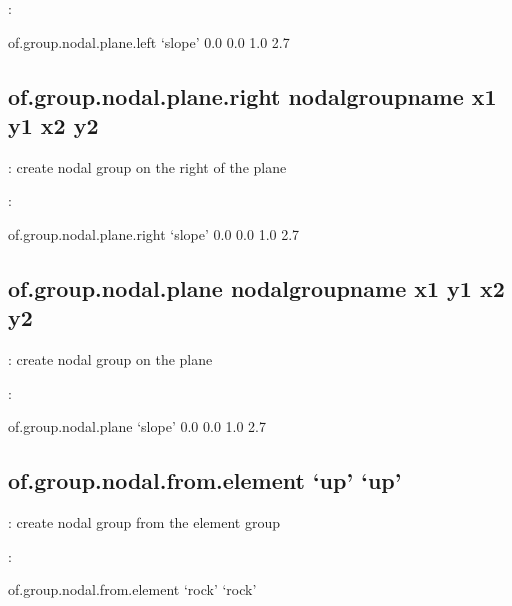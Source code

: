 \documentclass[letterpaper,10pt,english]{sphinxmanual}
\begin{document}
:

\begin{sphinxVerbatim}[commandchars=\\\{\}]
of.group.nodal.plane.left ‘slope’ 0.0 0.0 1.0 2.7
\end{sphinxVerbatim}


\subsection{of.group.nodal.plane.right nodalgroupname x1 y1 x2 y2}
\label{\detokenize{rst_tutorials/command_line_guide:of-group-nodal-plane-right-nodalgroupname-x1-y1-x2-y2}}
: create nodal group on the right of the plane

:

\begin{sphinxVerbatim}[commandchars=\\\{\}]
of.group.nodal.plane.right ‘slope’ 0.0 0.0 1.0 2.7
\end{sphinxVerbatim}


\subsection{of.group.nodal.plane nodalgroupname x1 y1 x2 y2}
\label{\detokenize{rst_tutorials/command_line_guide:of-group-nodal-plane-nodalgroupname-x1-y1-x2-y2}}
: create nodal group on the plane

:

\begin{sphinxVerbatim}[commandchars=\\\{\}]
of.group.nodal.plane ‘slope’ 0.0 0.0 1.0 2.7
\end{sphinxVerbatim}


\subsection{of.group.nodal.from.element ‘up’ ‘up’}
\label{\detokenize{rst_tutorials/command_line_guide:of-group-nodal-from-element-up-up}}
: create nodal group from the element group

:

\begin{sphinxVerbatim}[commandchars=\\\{\}]
of.group.nodal.from.element ‘rock’ ‘rock’
\end{sphinxVerbatim}
\end{document}
